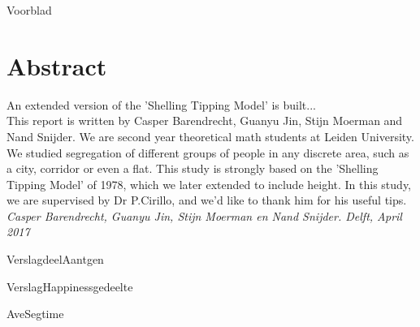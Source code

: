 \documentclass{article}
\begin{document}
{Voorblad}
\newpage

\section*{Abstract}
An extended version of the 'Shelling Tipping Model' is built...\\
This report is written by Casper Barendrecht, Guanyu Jin, Stijn Moerman and Nand Snijder. We are second year theoretical math students at Leiden University. We studied segregation of different groups of people in any discrete area, such as a city, corridor or even a flat. This study is strongly based on the 'Shelling Tipping Model' of 1978, which we later extended to include height. In this study, we are supervised by Dr P.Cirillo, and we'd like to thank him for his useful tips.\\
\textit{Casper Barendrecht, Guanyu Jin, Stijn Moerman en Nand Snijder. Delft, April 2017}
\newpage

\tableofcontents
\newpage


\newpage


\newpage

{VerslagdeelAantgen}
\newpage

{VerslagHappinessgedeelte}
\newpage

{AveSegtime}
\newpage
\end{document}
